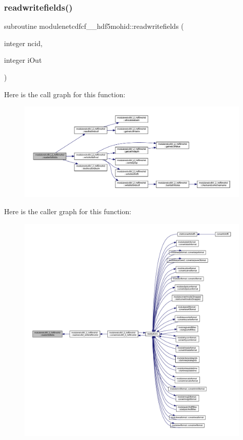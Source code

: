 \subsubsection{\texorpdfstring{readwritefields()}{readwritefields()}}
{\footnotesize\ttfamily subroutine modulenetcdfcf\+\_\+\_\+hdf5mohid\+::readwritefields (\begin{DoxyParamCaption}\item[{integer}]{ncid,  }\item[{integer}]{i\+Out }\end{DoxyParamCaption})\hspace{0.3cm}{\ttfamily [private]}}

Here is the call graph for this function\+:\nopagebreak
\begin{figure}[H]
\begin{center}
\leavevmode
\includegraphics[width=350pt]{namespacemodulenetcdfcf__2__hdf5mohid_aebb4610701d55eaa0ab3294968f44ff9_cgraph}
\end{center}
\end{figure}
Here is the caller graph for this function\+:\nopagebreak
\begin{figure}[H]
\begin{center}
\leavevmode
\includegraphics[width=350pt]{namespacemodulenetcdfcf__2__hdf5mohid_aebb4610701d55eaa0ab3294968f44ff9_icgraph}
\end{center}
\end{figure}
